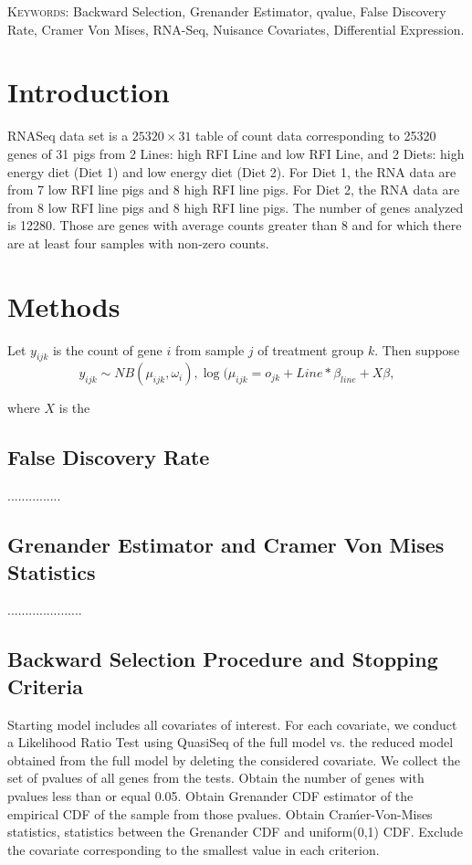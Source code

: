 \documentclass[11pt]{article}
\begin{document}
\vspace*{.3in}

\noindent\textsc{Keywords}: {Backward Selection, Grenander Estimator, qvalue, False Discovery Rate, Cramer Von Mises, RNA-Seq, Nuisance Covariates, Differential Expression.}

\newpage

\section{Introduction}
RNASeq data set is a $25320 \times 31$ table of count data corresponding
to 25320 genes of 31 pigs from 2 Lines: high RFI Line and low RFI
Line, and 2 Diets: high energy diet (Diet 1) and low energy diet (Diet
2). For Diet 1, the RNA data are from 7 low RFI line pigs and 8 high RFI
line pigs. For Diet 2, the RNA data are from 8 low RFI line pigs and 8
high RFI line pigs.
The number of genes analyzed is
12280. Those are genes with average counts greater than 8 and for
which there are at least four samples with non-zero counts.

\section{Methods}
Let $y_{ijk}$ is the count of gene $i$ from sample $j$ of treatment group $k$. Then suppose 
\[
y_{ijk} \sim NB(\mu_{ijk}, \omega_i), \log(\mu_{ijk} = o_{jk} + Line*\beta_{line} + X\beta,
\]

where $X$ is the 
\subsection{False Discovery Rate}
...............
\subsection{Grenander Estimator and Cramer Von Mises Statistics}

.....................
\subsection{Backward Selection Procedure and Stopping Criteria}

Starting model includes all covariates of interest. For each covariate,
we conduct a Likelihood Ratio Test using QuasiSeq of the full model
vs. the reduced model obtained from the full model by deleting the
considered covariate. We collect the set of pvalues of all genes from
the tests.
Obtain the number of genes with pvalues less than or equal 0.05.
Obtain Grenander CDF estimator of the empirical CDF of the sample
from those pvalues.
Obtain Craḿer-Von-Mises statistics,
 statistics between the Grenander CDF and
uniform(0,1) CDF.
Exclude the covariate corresponding to the smallest value in each criterion.
\end{document}
